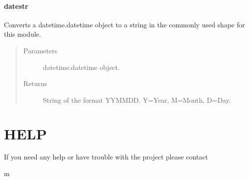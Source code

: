 \documentclass[letterpaper,10pt,english]{sphinxmanual}
\begin{document}
\subsubsection{datestr}
\label{\detokenize{generated/MPPy.tools.tools.datestr:datestr}}\label{\detokenize{generated/MPPy.tools.tools.datestr::doc}}

\begin{fulllineitems}
\label{\detokenize{generated/MPPy.tools.tools.datestr:MPPy.tools.tools.datestr}}
Converts a datetime.datetime object to a string in the commonly used shape for this module.
\begin{quote}\begin{description}
\item[{Parameters}] \leavevmode
{} \textendash{} datetime.datetime object.

\item[{Returns}] \leavevmode
String of the format YYMMDD. Y=Year, M=Month, D=Day.

\end{description}\end{quote}

\end{fulllineitems}



\chapter{HELP}
\label{\detokenize{help:help}}\label{\detokenize{help::doc}}
If you need any help or have trouble with the project please contact 


\renewcommand{\indexname}{Python Module Index}
\begin{sphinxtheindex}
\def\bigletter#1{{\Large\sffamily#1}\nopagebreak\vspace{1mm}}
\bigletter{m}
\item {}
\item {}
\end{sphinxtheindex}

\renewcommand{\indexname}{Index}
\printindex
\end{document}

